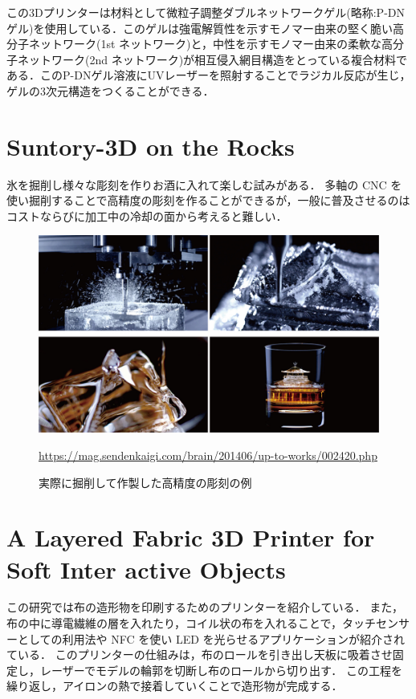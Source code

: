 この3Dプリンターは材料として微粒子調整ダブルネットワークゲル(略称:P-DNゲル)を使用している．このゲルは強電解質性を示すモノマー由来の堅く脆い高分子ネットワーク(1st ネットワーク)と，中性を示すモノマー由来の柔軟な高分子ネットワーク(2nd ネットワーク)が相互侵入網目構造をとっている複合材料である．このP-DNゲル溶液にUVレーザーを照射することでラジカル反応が生じ，ゲルの3次元構造をつくることができる．


\section{Suntory-3D on the Rocks\cite{b}}
\label{sec:enum}

氷を掘削し様々な彫刻を作りお酒に入れて楽しむ試みがある．
多軸の CNC を使い掘削することで高精度の彫刻を作ることができるが，一般に普及させるのはコストならびに加工中の冷却の面から考えると難しい．

\begin{figure}[H]
  \centering
  \includegraphics[width=12truecm]{./fig/Suntory.jpg}
  \caption{実際に掘削して作製した高精度の彫刻の例}
  \url{https://mag.sendenkaigi.com/brain/201406/up-to-works/002420.php} %
  \label{fig:Suntory}
\end{figure}


\section{A Layered Fabric 3D Printer for Soft Inter active Objects\cite{c}}
\label{sec:enum}
この研究では布の造形物を印刷するためのプリンターを紹介している．
また，布の中に導電繊維の層を入れたり，コイル状の布を入れることで，タッチセンサーとしての利用法や NFC を使い LED を光らせるアプリケーションが紹介されている．
このプリンターの仕組みは，布のロールを引き出し天板に吸着させ固定し，レーザーでモデルの輪郭を切断し布のロールから切り出す．
この工程を繰り返し，アイロンの熱で接着していくことで造形物が完成する．

